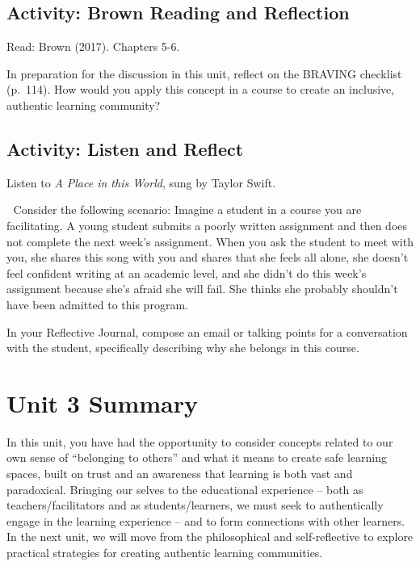 \documentclass[
]{book}
\begin{document}
\hypertarget{activity-brown-reading-and-reflection-1}{%
\subsection{Activity: Brown Reading and Reflection}\label{activity-brown-reading-and-reflection-1}}

\begin{reflect}
Read: Brown (2017). Chapters 5-6.

In preparation for the discussion in this unit, reflect on the BRAVING
checklist (p.~114). How would you apply this concept in a course to
create an inclusive, authentic learning community?
\end{reflect}

\hypertarget{activity-listen-and-reflect-1}{%
\subsection{Activity: Listen and Reflect}\label{activity-listen-and-reflect-1}}

\begin{video}
Listen to \emph{A Place in this World}, sung by Taylor Swift.

💭 Consider the following scenario: Imagine a student in a course you
are facilitating. A young student submits a poorly written assignment
and then does not complete the next week's assignment. When you ask the
student to meet with you, she shares this song with you and shares that
she feels all alone, she doesn't feel confident writing at an academic
level, and she didn't do this week's assignment because she's afraid she
will fail. She thinks she probably shouldn't have been admitted to this
program.

In your Reflective Journal, compose an email or talking points for a
conversation with the student, specifically describing why she belongs
in this course.
\end{video}

\hypertarget{unit-3-summary}{%
\section*{Unit 3 Summary}\label{unit-3-summary}}

In this unit, you have had the opportunity to consider concepts related to our own sense of ``belonging to others'' and what it means to create safe learning spaces, built on trust and an awareness that learning is both vast and paradoxical. Bringing our selves to the educational experience -- both as teachers/facilitators and as students/learners, we must seek to authentically engage in the learning experience -- and to form connections with other learners. In the next unit, we will move from the philosophical and self-reflective to explore practical strategies for creating authentic learning communities.
\end{document}
